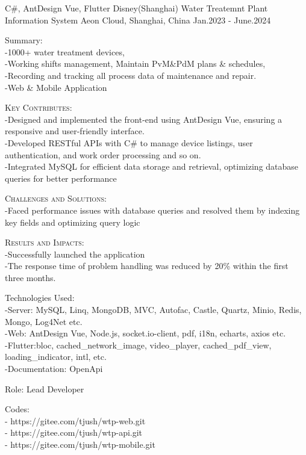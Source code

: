 \begin{cventries}
  \cventry
    {C\#, AntDesign Vue, Flutter} %
    {Disney(Shanghai) Water Treatemnt Plant Information System} %
    {Aeon Cloud, Shanghai, China} %
    {Jan.2023 - June.2024} %
    {
      \begin{cvitems} %
        \item {Summary: \\-1000+ water treatment devices, \\-Working shifts management, Maintain PvM\&PdM plans \& schedules, \\-Recording and tracking all process data of maintenance and repair. \\ -Web \& Mobile Application}
        \item {\textsc{Key Contributes}: \\-Designed and implemented the front-end using AntDesign Vue, ensuring a responsive and user-friendly interface. \\-Developed RESTful APIs with C\#  to manage device listings, user authentication, and work order processing and so on. \\-Integrated MySQL for efficient data storage and retrieval, optimizing database queries for better performance}
        \item {\textsc{Challenges and Solutions}: \\-Faced performance issues with database queries and resolved them by indexing key fields and optimizing query logic }
        \item {\textsc{Results and Impacts}: \\-Successfully launched the application \\-The response time of problem handling was reduced by 20\% within the first three months.}
        \item {{Technologies Used}: \\ -Server: MySQL, Linq, MongoDB, MVC,  Autofac, Castle, Quartz, Minio, Redis, Mongo, Log4Net etc. \\-Web: AntDesign Vue, Node.js, socket.io-client, pdf, i18n, echarts, axios etc. \\-Flutter:bloc, cached\_network\_image, video\_player, cached\_pdf\_view, loading\_indicator, intl, etc. \\ -Documentation: OpenApi}        
        \item {{Role}: Lead Developer}
        \item {{Codes:} \\- https://gitee.com/tjush/wtp-web.git \\- https://gitee.com/tjush/wtp-api.git \\- https://gitee.com/tjush/wtp-mobile.git}

\end{cvitems}}
\end{cventries}
